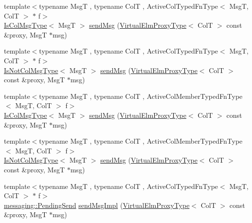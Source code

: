 \begin{DoxyCompactItemize}
\item 
{\footnotesize template$<$typename MsgT , typename ColT , Active\+Col\+Typed\+Fn\+Type$<$ Msg\+T, Col\+T $>$ $\ast$ f$>$ }\\\hyperlink{structvt_1_1vrt_1_1collection_1_1_collection_manager_a21c21612c806016788057aeab142af20}{Is\+Col\+Msg\+Type}$<$ MsgT $>$ \hyperlink{structvt_1_1vrt_1_1collection_1_1_collection_manager_a55777b57bfad6c9d87d946ed773a391d}{send\+Msg} (\hyperlink{namespacevt_1_1vrt_a620a5c8c59d13e513f690c74b4af516f}{Virtual\+Elm\+Proxy\+Type}$<$ ColT $>$ const \&proxy, MsgT $\ast$msg)
\item 
{\footnotesize template$<$typename MsgT , typename ColT , Active\+Col\+Typed\+Fn\+Type$<$ Msg\+T, Col\+T $>$ $\ast$ f$>$ }\\\hyperlink{structvt_1_1vrt_1_1collection_1_1_collection_manager_ae376deeefd4f89a0b1c93849977715d9}{Is\+Not\+Col\+Msg\+Type}$<$ MsgT $>$ \hyperlink{structvt_1_1vrt_1_1collection_1_1_collection_manager_a4f87f7f738cde8d48c9c18d16cc06166}{send\+Msg} (\hyperlink{namespacevt_1_1vrt_a620a5c8c59d13e513f690c74b4af516f}{Virtual\+Elm\+Proxy\+Type}$<$ ColT $>$ const \&proxy, MsgT $\ast$msg)
\item 
{\footnotesize template$<$typename MsgT , typename ColT , Active\+Col\+Member\+Typed\+Fn\+Type$<$ Msg\+T, Col\+T $>$ f$>$ }\\\hyperlink{structvt_1_1vrt_1_1collection_1_1_collection_manager_a21c21612c806016788057aeab142af20}{Is\+Col\+Msg\+Type}$<$ MsgT $>$ \hyperlink{structvt_1_1vrt_1_1collection_1_1_collection_manager_a3ea2d130487c02b8dbda05b7befda88d}{send\+Msg} (\hyperlink{namespacevt_1_1vrt_a620a5c8c59d13e513f690c74b4af516f}{Virtual\+Elm\+Proxy\+Type}$<$ ColT $>$ const \&proxy, MsgT $\ast$msg)
\item 
{\footnotesize template$<$typename MsgT , typename ColT , Active\+Col\+Member\+Typed\+Fn\+Type$<$ Msg\+T, Col\+T $>$ f$>$ }\\\hyperlink{structvt_1_1vrt_1_1collection_1_1_collection_manager_ae376deeefd4f89a0b1c93849977715d9}{Is\+Not\+Col\+Msg\+Type}$<$ MsgT $>$ \hyperlink{structvt_1_1vrt_1_1collection_1_1_collection_manager_a229f96a5075562ee92743d69fc285254}{send\+Msg} (\hyperlink{namespacevt_1_1vrt_a620a5c8c59d13e513f690c74b4af516f}{Virtual\+Elm\+Proxy\+Type}$<$ ColT $>$ const \&proxy, MsgT $\ast$msg)
\item 
{\footnotesize template$<$typename MsgT , typename ColT , Active\+Col\+Typed\+Fn\+Type$<$ Msg\+T, Col\+T $>$ $\ast$ f$>$ }\\\hyperlink{structvt_1_1messaging_1_1_pending_send}{messaging\+::\+Pending\+Send} \hyperlink{structvt_1_1vrt_1_1collection_1_1_collection_manager_afc14691c6992cc5d7e51118b1386b67c}{send\+Msg\+Impl} (\hyperlink{namespacevt_1_1vrt_a620a5c8c59d13e513f690c74b4af516f}{Virtual\+Elm\+Proxy\+Type}$<$ ColT $>$ const \&proxy, MsgT $\ast$msg)

\end{DoxyCompactItemize}
